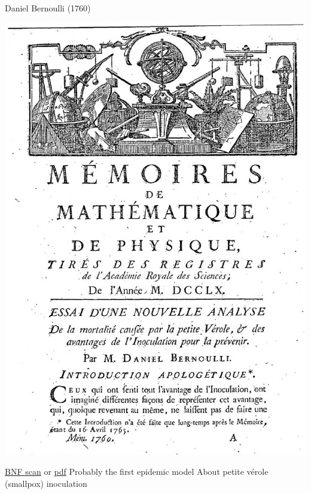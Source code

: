 \documentclass[aspectratio=169]{beamer}\usepackage[]{graphicx}\usepackage[]{xcolor}
\begin{document}
\begin{frame}{Daniel Bernoulli (1760)}
\begin{minipage}{0.5\textwidth}
    \includegraphics[width=\textwidth]{FIGS/Bernoulli-1760-first_page.jpg}
\end{minipage}
\begin{minipage}{0.47\textwidth}
\bbullet \href{https://gallica.bnf.fr/ark:/12148/bpt6k3558n/f220.item}{BNF scan} or \href{https://julien-arino.github.io/assets/pdf/Bernoulli-1760.pdf}{pdf}
\vfill
\bbullet Probably the first epidemic model
\vfill
\bbullet About petite vérole (smallpox) inoculation
\end{minipage}
\end{frame}
\end{document}
